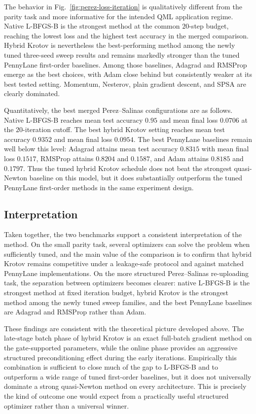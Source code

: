 \documentclass[aps,prb,10pt,twocolumn,superscriptaddress]{revtex4-2}
\begin{document}
The behavior in Fig.~\ref{fig:perez-loss-iteration} is qualitatively different from the parity task and more informative for the intended QML application regime. Native L-BFGS-B is the strongest method at the common \(20\)-step budget, reaching the lowest loss and the highest test accuracy in the merged comparison. Hybrid Krotov is nevertheless the best-performing method among the newly tuned three-seed sweep results and remains markedly stronger than the tuned PennyLane first-order baselines. Among those baselines, Adagrad and RMSProp emerge as the best choices, with Adam close behind but consistently weaker at its best tested setting. Momentum, Nesterov, plain gradient descent, and SPSA are clearly dominated.

Quantitatively, the best merged Perez--Salinas configurations are as follows. Native L-BFGS-B reaches mean test accuracy \(0.95\) and mean final loss \(0.0706\) at the \(20\)-iteration cutoff. The best hybrid Krotov setting reaches mean test accuracy \(0.9352\) and mean final loss \(0.0954\). The best PennyLane baselines remain well below this level: Adagrad attains mean test accuracy \(0.8315\) with mean final loss \(0.1517\), RMSProp attains \(0.8204\) and \(0.1587\), and Adam attains \(0.8185\) and \(0.1797\). Thus the tuned hybrid Krotov schedule does not beat the strongest quasi-Newton baseline on this model, but it does substantially outperform the tuned PennyLane first-order methods in the same experiment design.

\subsection{Interpretation}

Taken together, the two benchmarks support a consistent interpretation of the method. On the small parity task, several optimizers can solve the problem when sufficiently tuned, and the main value of the comparison is to confirm that hybrid Krotov remains competitive under a leakage-safe protocol and against matched PennyLane implementations. On the more structured Perez--Salinas re-uploading task, the separation between optimizers becomes clearer: native L-BFGS-B is the strongest method at fixed iteration budget, hybrid Krotov is the strongest method among the newly tuned sweep families, and the best PennyLane baselines are Adagrad and RMSProp rather than Adam.

These findings are consistent with the theoretical picture developed above. The late-stage batch phase of hybrid Krotov is an exact full-batch gradient method on the gate-supported parameters, while the online phase provides an aggressive structured preconditioning effect during the early iterations. Empirically this combination is sufficient to close much of the gap to L-BFGS-B and to outperform a wide range of tuned first-order baselines, but it does not universally dominate a strong quasi-Newton method on every architecture. This is precisely the kind of outcome one would expect from a practically useful structured optimizer rather than a universal winner.
\end{document}
